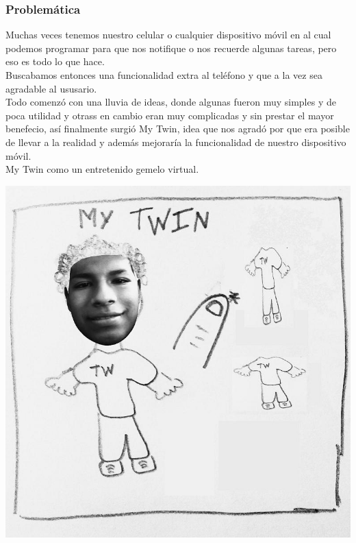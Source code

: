 \documentclass[10pt]{article}
\begin{document}
{{\begin{flushleft}
\subsubsection{Problem\'atica}
Muchas veces tenemos nuestro celular o cualquier dispositivo m\'ovil en al cual podemos programar para que nos notifique o nos recuerde algunas tareas, pero eso es todo lo que hace.\\
Buscabamos entonces una funcionalidad extra al tel\'efono y que a la vez sea agradable al ususario.\\
Todo comenz\'o con una lluvia de ideas, donde algunas fueron muy simples y de poca utilidad y otrass en cambio eran muy complicadas y sin prestar el mayor benefecio, as\'i finalmente surgi\'o My Twin, idea que nos agrad\'o por que era posible de llevar a la realidad y adem\'as mejorar\'ia la funcionalidad de nuestro dispositivo m\'ovil.\\
My Twin como un entretenido gemelo virtual.\\
\vspace{0.3in}
\begin{center}
\includegraphics[scale=0.35]{bosquejoI1}
\end{center}

\end{flushleft}
}

}
\end{document}
